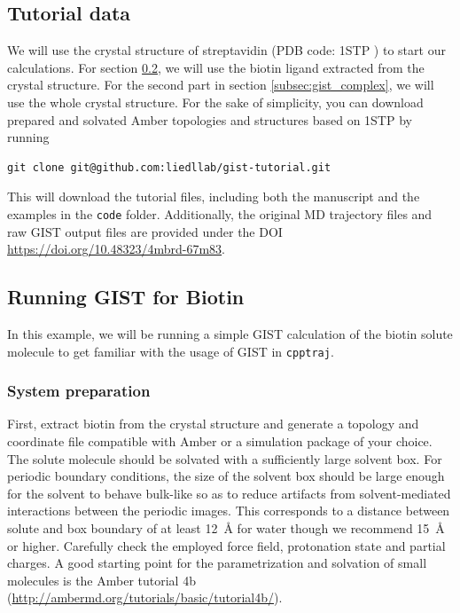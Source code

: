 \documentclass[9pt,tutorial]{livecoms}
\newcommand{\software}{\texttt}
\newcommand\inlinecode{\texttt}
\begin{document}
\subsection{Tutorial data}
We will use the crystal structure of streptavidin (PDB code: 1STP \cite{Weber1989-streptavidin-structure}) to start our calculations.
For section \ref{subsec:gist_biotin}, we will use the biotin ligand extracted from the crystal structure.
For the second part in section \ref{subsec:gist_complex}, we will use the whole crystal structure.
For the sake of simplicity, you can download prepared and solvated Amber topologies and structures based on 1STP by running
\begin{lstlisting}[style=bash]
git clone git@github.com:liedllab/gist-tutorial.git
\end{lstlisting}
This will download the tutorial files, including both the manuscript and the examples in the \inlinecode{code} folder.
Additionally, the original MD trajectory files and raw GIST output files are provided under the DOI \url{https://doi.org/10.48323/4mbrd-67m83}.
\subsection{Running GIST for Biotin}
\label{subsec:gist_biotin}
In this example, we will be running a simple GIST calculation of the biotin solute molecule to get familiar with the usage of GIST in \software{cpptraj}.
\subsubsection{System preparation}
First, extract biotin from the crystal structure and generate a topology and coordinate file compatible with Amber or a simulation package of your choice.
The solute molecule should be solvated with a sufficiently large solvent box. 
For periodic boundary conditions, the size of the solvent box should be large enough for the solvent to behave bulk-like so as to reduce artifacts from solvent-mediated interactions between the periodic images. 
This corresponds to a distance between solute and box boundary of at least \qty{12}{\angstrom} for water \cite{Chen2021,Waibl2022-gist-solvents} though we recommend \qty{15}{\angstrom} or higher.
Carefully check the employed force field, protonation state and partial charges.
A good starting point for the parametrization and solvation of small molecules is the Amber tutorial 4b (\url{http://ambermd.org/tutorials/basic/tutorial4b/}).
\end{document}
